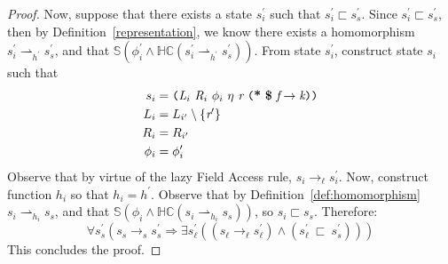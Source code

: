 \begin{proof}
Now, suppose that there exists a state $s_i^\prime$ such that $s_i^\prime \sqsubset s_s^\prime$. Since $s_i^\prime \sqsubset s_s^\prime$, then by Definition~\ref{representation}, we know there exists a homomorphism $s_i^\prime \rightharpoonup_{h^\prime} s_s^\prime$, and that $\mathbb{S}( \phi_i^\prime \wedge \mathbb{HC}(s_i^\prime \rightharpoonup_{h^\prime} s_s^\prime) )$. From state $s_i^\prime$, construct state $s_i$ such that 
\begin{align*}
s_i &= \lp \cfgnt{L}_{i}\ \cfgnt{R}_{i}\ \phi_i\ \eta\ \cfgnt{r}\ \lp \cfgt{*}\ \cfgt{\$}\ \cfgnt{f} \rightarrow \cfgnt{k}\rp \rp\\
L_i &= L_{i^\prime} \setminus \{\cfgnt{r}^\prime \}\\
R_i &= R_{i^\prime}\\
\phi_i &= \phi_i^\prime
\end{align*}
Observe that by virtue of the lazy Field Access rule, $s_i \rightarrow_\ell s_i^\prime$. Now, construct function $h_i$ so that $h_i = h^\prime$. Observe that by Definition~\ref{def:homomorphism} $s_i \rightharpoonup_{h_i} s_s$,  and that $\mathbb{S}( \phi_i \wedge \mathbb{HC}(s_i \rightharpoonup_{h_i} s_s) )$, so $s_i \sqsubset s_s$. Therefore:
\begin{equation}
\forall s_s^\prime ( s_s \rightarrow_s s_s^\prime\Rightarrow \exists s_\ell^\prime( (s_\ell \rightarrow_\ell s_\ell^\prime )\wedge (s_\ell^\prime\ \sqsubset\ s_s^\prime ))  )
\end{equation}
 This concludes the proof.

%

\end{proof}

